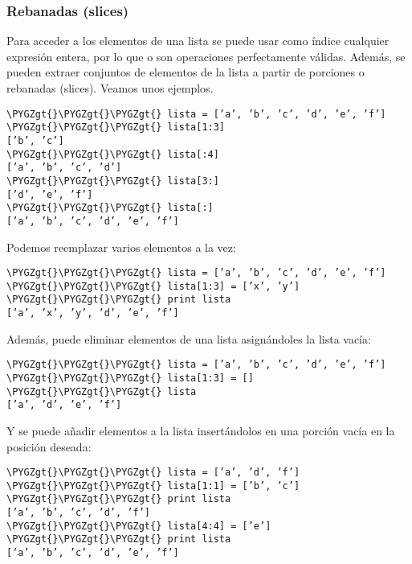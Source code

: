 \documentclass[a4paper,12pt,spanish]{sphinxmanual}
\def\PYGZgt{\char`\>}
\begin{document}
\subsubsection{Rebanadas (slices)}
\label{Unidad03:rebanadas-slices}
Para acceder a los elementos de una lista se puede usar como índice
cualquier expresión entera, por lo que  o
 son operaciones perfectamente válidas. Además, se
pueden extraer conjuntos de elementos de la lista a partir de porciones
o rebanadas (slices). Veamos unos ejemplos.

\begin{Verbatim}[commandchars=\\\{\}]
\PYGZgt{}\PYGZgt{}\PYGZgt{} lista = [’a’, ’b’, ’c’, ’d’, ’e’, ’f’]
\PYGZgt{}\PYGZgt{}\PYGZgt{} lista[1:3]
[’b’, ’c’]
\PYGZgt{}\PYGZgt{}\PYGZgt{} lista[:4]
[’a’, ’b’, ’c’, ’d’]
\PYGZgt{}\PYGZgt{}\PYGZgt{} lista[3:]
[’d’, ’e’, ’f’]
\PYGZgt{}\PYGZgt{}\PYGZgt{} lista[:]
[’a’, ’b’, ’c’, ’d’, ’e’, ’f’]
\end{Verbatim}

Podemos reemplazar varios elementos a la vez:

\begin{Verbatim}[commandchars=\\\{\}]
\PYGZgt{}\PYGZgt{}\PYGZgt{} lista = [’a’, ’b’, ’c’, ’d’, ’e’, ’f’]
\PYGZgt{}\PYGZgt{}\PYGZgt{} lista[1:3] = [’x’, ’y’]
\PYGZgt{}\PYGZgt{}\PYGZgt{} print lista
[’a’, ’x’, ’y’, ’d’, ’e’, ’f’]
\end{Verbatim}

Además, puede eliminar elementos de una lista asignándoles la lista
vacía:

\begin{Verbatim}[commandchars=\\\{\}]
\PYGZgt{}\PYGZgt{}\PYGZgt{} lista = [’a’, ’b’, ’c’, ’d’, ’e’, ’f’]
\PYGZgt{}\PYGZgt{}\PYGZgt{} lista[1:3] = []
\PYGZgt{}\PYGZgt{}\PYGZgt{} lista
[’a’, ’d’, ’e’, ’f’]
\end{Verbatim}

Y se puede añadir elementos a la lista insertándolos en una porción
vacía en la posición deseada:

\begin{Verbatim}[commandchars=\\\{\}]
\PYGZgt{}\PYGZgt{}\PYGZgt{} lista = [’a’, ’d’, ’f’]
\PYGZgt{}\PYGZgt{}\PYGZgt{} lista[1:1] = [’b’, ’c’]
\PYGZgt{}\PYGZgt{}\PYGZgt{} print lista
[’a’, ’b’, ’c’, ’d’, ’f’]
\PYGZgt{}\PYGZgt{}\PYGZgt{} lista[4:4] = [’e’]
\PYGZgt{}\PYGZgt{}\PYGZgt{} print lista
[’a’, ’b’, ’c’, ’d’, ’e’, ’f’]
\end{Verbatim}
\end{document}
